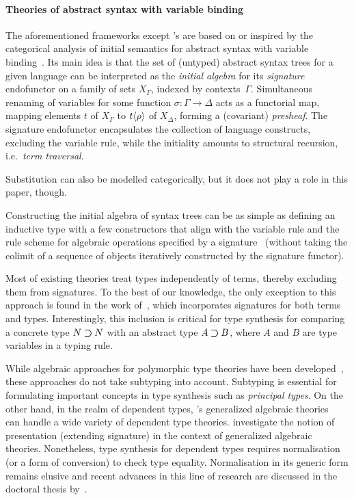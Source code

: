 \paragraph{Theories of abstract syntax with variable binding}
The aforementioned frameworks except \citeauthor{Gheri2020}'s are based on or inspired by the categorical analysis of initial semantics for abstract syntax with variable binding~\cite{Fiore1999}.
Its main idea is that the set of (untyped) abstract syntax trees for a given language can be interpreted as the \emph{initial algebra} for its \emph{signature} endofunctor on a family of sets $X_{\Gamma}$, indexed by contexts~$\Gamma$.
Simultaneous renaming of variables for some function $\sigma\colon \Gamma \to \Delta$ acts as a functorial map, mapping elements $t$ of $X_{\Gamma}$ to ${t}\!\left<{\rho}\right>$ of $X_{\Delta}$, forming a (covariant) \emph{presheaf}.
The signature endofunctor encapsulates the collection of language constructs, excluding the variable rule, while the initiality amounts to structural recursion, i.e.\ \emph{term traversal}.

Substitution can also be modelled categorically, but it does not play a role in this paper, though.

\begin{remark}
Constructing the initial algebra of syntax trees can be as simple as defining an inductive type with a few constructors that align with the variable rule and the rule scheme for algebraic operations specified by a signature~\citep{Allais2021,Fiore2022} (without taking the colimit of a sequence of objects iteratively constructed by the signature functor).
\end{remark}

\begin{remark} \label{re:type-signature}
Most of existing theories treat types independently of terms, thereby excluding them from signatures.
To the best of our knowledge, the only exception to this approach is found in the work of~\citet{Arkor2020}, which incorporates signatures for both terms and types.
Interestingly, this inclusion is critical for type synthesis for comparing a concrete type $N \mathbin{\bm{\supset}} N$ with an abstract type $A \mathbin{\bm{\supset}} B$, where $A$ and $B$ are type variables in a typing rule.
\end{remark}

While algebraic approaches for polymorphic type theories have been developed~\citep{Fiore2013,Hamana2011}, these approaches do not take subtyping into account.
Subtyping is essential for formulating important concepts in type synthesis such as \emph{principal types}.
On the other hand, in the realm of dependent types, \citeauthor{Cartmell1986}'s generalized algebraic theories~\citeyearpar{Cartmell1986} can handle a wide variety of dependent type theories.
\citet{Bezem2021} investigate the notion of presentation (extending signature) in the context of generalized algebraic theories.
Nonetheless, type synthesis for dependent types requires normalisation (or a form of conversion) to check type equality.
Normalisation in its generic form remains elusive and recent advances in this line of research are discussed in the doctoral thesis by~\citet{Valliappan2023}.

